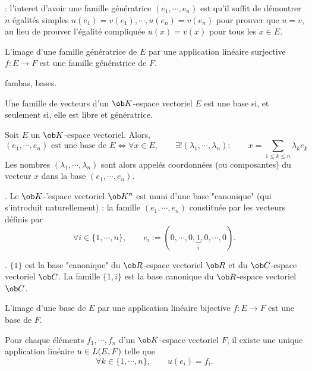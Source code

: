 \Remarque : l'interet d'avoir une famille g\'en\'eratrice $(e_1,\cdots,e_n)$ est qu'il suffit 
de d\'emontrer $n$ \'egalit\'es simples $u(e_1)=v(e_1),\cdots, u(e_n)=v(e_n)$ pour prouver que $u=v$, au lieu de prouver l'\'egalit\'e compliqu\'ee $u(x)=v(x)$ pour tous les $x\in E$. 
\bigskip


\Propriete L'image d'une famille g\'en\'eratrice de $E$ par une application lin\'eaire surjective $f:E\to
F$ est une famille g\'en\'eratrice de $F$. 

\Subsection fambas, bases. 
\bigskip

\Definition []  Une famille de vecteurs d'un $\ob K$-espace vectoriel $E$ est une base si, et seulement si, elle est libre et g\'en\'eratrice. 
\bigskip

\Propriete []  Soit $E$ un $\ob K$-espace vectoriel. Alors, 
$$
{(e_1,\cdots,e_n)\mbox{ est une base de }E\Longleftrightarrow \forall x\in E, \qquad \exists!(\lambda_1,\cdots,\lambda_n):\qquad x=\sum_{1\le k\le n}\lambda_ke_k}.
$$
Les nombres $(\lambda_1,\cdots,\lambda_n)$ sont alors appel\'es coordonn\'ees (ou composantes) du vecteur $x$ 
dans la base $(e_1,\cdots,e_n)$. 
\bigskip


\Exemple.  Le $\ob K$-'espace vectoriel $\ob K^n$ est muni d'une base "canonique" (qui s'introduit naturellement) : la famille $(e_1,\cdots, e_n)$ constitu\'ee par les vecteurs d\'efinis par 
$$
\forall i\in\{1,\cdots,n\},\qquad e_i:=(0,\cdots, 0,\underbrace{1}_{i},0,\cdots, 0). 
$$

\Exemple.  $\{1\}$ est la base "canonique" du $\ob R$-espace vectoriel $\ob R$ et du $\ob C$-espace vectoriel $\ob C$. La famille $\{1,i\}$ est la base canonique du $\ob R$-espace vectoriel $\ob C$. 
\bigskip

\Propriete []  L'image d'une base de $E$ par une application lin\'eaire bijective $f:E\to F$ est une base de $F$. 
\bigskip

Pour chaque \'el\'ements $f_1,\cdots, f_n$ d'un $\ob K$-espace vectoriel $F$, il existe une unique application lin\'eaire $u\in\sc L(E,F)$ telle que 
$$
\forall k\in\{1,\cdots, n\}, \qquad u(e_i)=f_i.
$$

